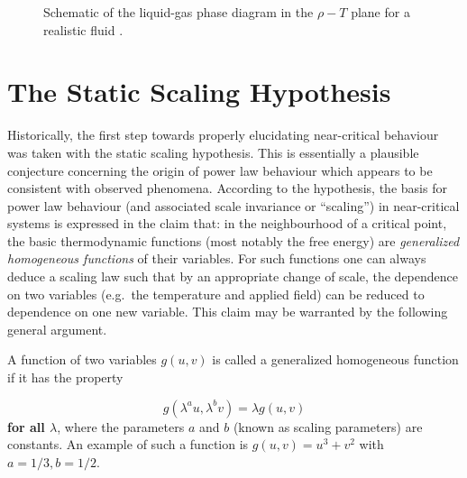 \documentclass[
  letterpaper,
  enabledeprecatedfontcommands]{report}
\begin{document}
\begin{figure}


\caption{\label{fig-realfluid}Schematic of the liquid-gas phase diagram
in the \(\rho-T\) plane for a realistic fluid .}

\end{figure}%

\chapter{The Static Scaling
Hypothesis}\label{the-static-scaling-hypothesis}

Historically, the first step towards properly elucidating near-critical
behaviour was taken with the static scaling hypothesis. This is
essentially a plausible conjecture concerning the origin of power law
behaviour which appears to be consistent with observed phenomena.
According to the hypothesis, the basis for power law behaviour (and
associated scale invariance or ``scaling'') in near-critical systems is
expressed in the claim that: in the neighbourhood of a critical point,
the basic thermodynamic functions (most notably the free energy) are
\emph{generalized homogeneous functions} of their variables. For such
functions one can always deduce a scaling law such that by an
appropriate change of scale, the dependence on two variables (e.g.~the
temperature and applied field) can be reduced to dependence on one new
variable. This claim may be warranted by the following general argument.

A function of two variables \(g(u,v)\) is called a generalized
homogeneous function if it has the property

\[g(\lambda^au,\lambda^bv)=\lambda g(u,v)\] \textbf{for all
\(\lambda\)}, where the parameters \(a\) and \(b\) (known as scaling
parameters) are constants. An example of such a function is
\(g(u,v)=u^3+v^2\) with \(a=1/3, b=1/2\).
\end{document}
